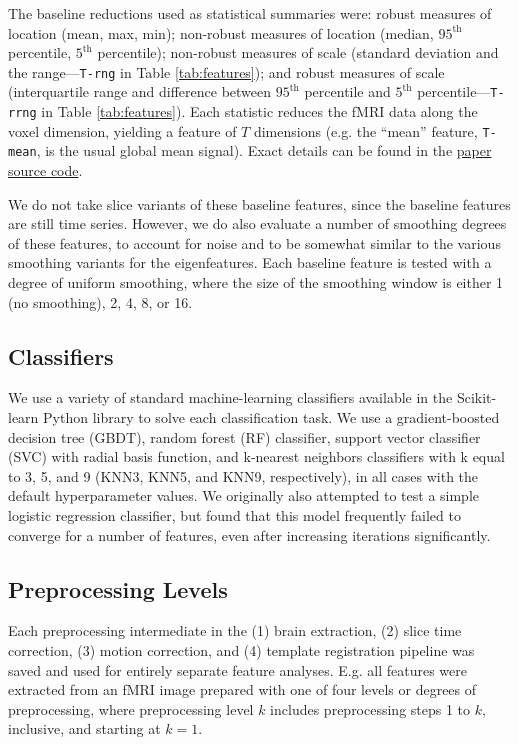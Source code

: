 \documentclass[12pt]{spieman}  %
\newcommand{\code}[1]{\small\texttt{#1}\normalsize}
\begin{document}
\begin{spacing}{2}
The baseline reductions used as statistical summaries were: robust measures of
location (mean, max, min); non-robust measures of location (median,
\(95^{\text{th}}\) percentile, \(5^{\text{th}}\) percentile); non-robust
measures of scale (standard deviation and the range—\code{T-rng} in Table
\ref{tab:features}); and robust measures of scale (interquartile range and
difference between \(95^{\text{th}}\) percentile and \(5^{\text{th}}\)
percentile—\code{T-rrng} in Table \ref{tab:features}). Each statistic reduces
the fMRI data along the voxel dimension, yielding a feature of \(T\) dimensions
(e.g. the ``mean'' feature, \code{T-mean}, is the usual global mean signal).
Exact details can be found in the
\href{https://github.com/DM-Berger/random-matrix-fmri/blob/master/code/rmt/enumerables.py#L51-L69}{paper
source code}.

We do not take slice variants of these baseline features, since the baseline
features are still time series. However, we do also evaluate a number of
smoothing degrees of these features, to account for noise and to be somewhat
similar to the various smoothing variants for the eigenfeatures. Each baseline
feature is tested with a degree of uniform smoothing, where the size of the
smoothing window is either 1 (no smoothing), 2, 4, 8, or 16.


\subsection{Classifiers}

We use a variety of standard machine-learning classifiers available in the
Scikit-learn\cite{pedregosaScikitlearnMachineLearning2011} Python library to
solve each classification task. We use a gradient-boosted decision tree (GBDT),
random forest (RF) classifier, support vector classifier (SVC) with radial
basis function, and k-nearest neighbors classifiers with k equal to 3, 5, and 9
(KNN3, KNN5, and KNN9, respectively), in all cases with the default
hyperparameter values. We originally also attempted to test a simple logistic
regression classifier, but found that this model frequently failed to converge
for a number of features, even after increasing iterations significantly.

\subsection{Preprocessing Levels}

Each preprocessing intermediate in the (1) brain extraction, (2) slice time
correction, (3) motion correction, and (4) template registration pipeline was
saved and used for entirely separate feature analyses. E.g. all features were
extracted from an fMRI image prepared with one of four levels or degrees of
preprocessing, where preprocessing level \(k\) includes preprocessing steps 1 to \(k\),
inclusive, and starting at \(k = 1\).


\end{spacing}
\end{document}

